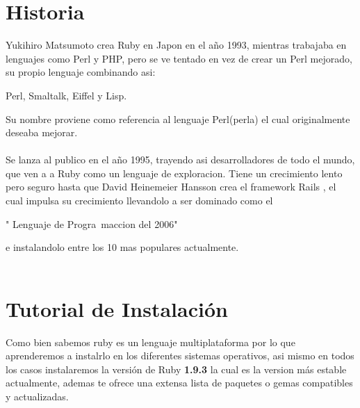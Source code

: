 \documentclass[11pt]{article} %
\begin{document}
\section{\fontsize{14}{0} \bf Historia}
Yukihiro Matsumoto crea  Ruby  en Japon en el año 1993, mientras trabajaba en lenguajes como Perl y PHP, pero se ve tentado en vez de crear un Perl mejorado,  su propio lenguaje combinando asi: \begin{bf}
Perl, Smaltalk, Eiffel y Lisp.
\end{bf} Su nombre proviene como referencia al lenguaje Perl(perla) el cual originalmente deseaba mejorar.\\ \\Se lanza al publico en el año 1995, trayendo asi desarrolladores de todo el mundo, que ven a a Ruby como un lenguaje de exploracion. Tiene un crecimiento lento pero seguro hasta que David Heinemeier Hansson crea el framework Rails , el cual impulsa su crecimiento llevandolo a ser dominado como el
\begin{bf}
" Lenguaje de Progra~maccion del 2006" 
\end{bf} e instalandolo entre los 10 mas populares actualmente.\\ \\


\section{\fontsize{14}{0} \bf Tutorial de Instalación}

Como bien sabemos ruby es un lenguaje multiplataforma por lo que aprenderemos a instalrlo en los diferentes sistemas operativos, asi mismo en todos los casos instalaremos la versión de Ruby {\bf 1.9.3} la cual es la version más estable actualmente, ademas te ofrece una extensa lista de paquetes o gemas compatibles y actualizadas.
\newpage
\end{document}
